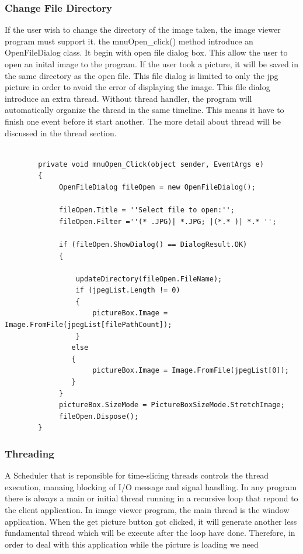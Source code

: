 \documentclass[oneside]{ecsgdp}         %
\begin{document}
\subsubsection*{Change File Directory}
If the user wish to change the directory of the image taken, the image viewer program must support it. the mnuOpen\_click() method introduce an OpenFileDialog class. It begin with open file dialog box. This allow the user to open an inital image to the program. If the user took a picture, it will be saved in the same directory as the open file. This file dialog is limited to only the jpg picture in order to avoid the error of displaying the image. 
This file dialog introduce an extra thread. Without thread handler, the program will automatically organize the thread in the same timeline. This means it have to finish one event before it start another. The more detail about thread will be discussed in the thread section. 
\begin{lstlisting}[caption={change file directory},label=lst:changeFD]

        private void mnuOpen_Click(object sender, EventArgs e)        
        {        
             OpenFileDialog fileOpen = new OpenFileDialog();      
            
             fileOpen.Title = ''Select file to open:'';   
             fileOpen.Filter =''(* .JPG)| *.JPG; |(*.* )| *.* '';           

             if (fileOpen.ShowDialog() == DialogResult.OK)    
             {
    
                 updateDirectory(fileOpen.FileName);     
                 if (jpegList.Length != 0)     
                 {                    
                     pictureBox.Image = Image.FromFile(jpegList[filePathCount]);       
                 }         
                else       
                {       
                     pictureBox.Image = Image.FromFile(jpegList[0]);        
                }        
             }        
             pictureBox.SizeMode = PictureBoxSizeMode.StretchImage;       
             fileOpen.Dispose();        
        }       
        \end{lstlisting}
\subsubsection*{Threading}

A Scheduler that is reponsible for time-slicing threads controls the thread execution, manaing blocking of I/O message and signal handling\cite{keithC}. In any program there is always a main or initial thread running in a recursive loop that repond to the client application. In image viewer program, the main thread is the window application. When the get picture button got clicked, it will generate another less fundamental thread which will be execute after the loop have done. Therefore, in order to deal with this application while the picture is loading we need
\end{document}
